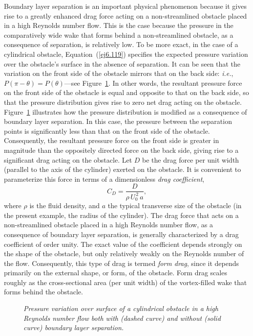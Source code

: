 Boundary layer separation is an important physical phenomenon because it gives rise to a greatly
enhanced drag force acting on a non-streamlined obstacle placed in a high Reynolds number flow. This is the case because the pressure in the comparatively wide
wake that forms behind a non-streamlined obstacle, as a consequence of separation, is relatively low. To be more exact, in the
case of a cylindrical obstacle, Equation~(\ref{ej6.119}) specifies the expected pressure variation over the obstacle's surface in the
absence of separation. It can be seen that the variation on the front side of the obstacle mirrors
that on the back side: {\em i.e.}, $P(\pi-\theta)=P(\theta)$---see Figure~\ref{fpres}. In other words, the resultant pressure force 
on the front side of the obstacle is equal and opposite to that  on the back side, so that the pressure distribution
gives rise to zero net drag acting on the obstacle. Figure~\ref{fpres} illustrates how the pressure distribution is modified
as a consequence of boundary layer separation. In this case, the pressure between the separation points is significantly less than that on the
front side of the obstacle. Consequently, the resultant pressure force on the front side  is
greater in magnitude than the oppositely directed force on the back side, giving rise to a significant drag
 acting on the obstacle. Let $D$ be the drag force per unit width (parallel to the axis
of the cylinder) exerted on the obstacle. It is convenient to parameterize this force in terms of a
dimensionless {\em drag coefficient},
\begin{equation}\label{ej6.120}
C_D = \frac{D}{\rho\,U_0^{\,2}\,a},
\end{equation}
where $\rho$ is the fluid density, and $a$ the typical transverse size of the obstacle (in the present example, the radius
of the cylinder). The drag force that acts on a non-streamlined obstacle  placed in a high Reynolds
number flow, as a consequence of boundary layer separation, is generally characterized by a drag coefficient of 
order unity.
The exact value of the coefficient depends strongly on the shape of the obstacle, but
only relatively weakly on the Reynolds number of the flow. Consequently, this type of drag is termed {\em form drag}, since it
depends primarily on the external shape, or form, of the obstacle. Form drag  scales roughly as the cross-sectional area (per unit width) of the vortex-filled wake that forms behind the obstacle.

\begin{figure}
\epsfysize=3.5in
\centerline{}
\caption{\em Pressure variation over surface of a cylindrical obstacle in a high Reynolds
number flow both with (dashed curve) and without (solid curve) boundary layer separation.}\label{fpres}
\end{figure}

